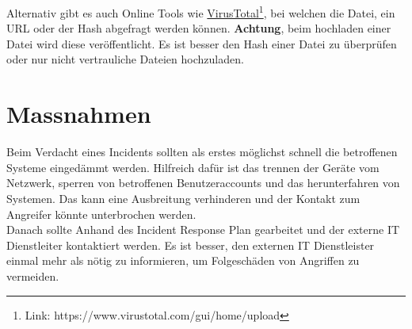 Alternativ gibt es auch Online Tools wie \href{https://www.virustotal.com/gui/home/upload}{VirusTotal}\footnote{Link: https://www.virustotal.com/gui/home/upload}, bei welchen die Datei, ein URL oder der Hash abgefragt werden können.
\textbf{Achtung}, beim hochladen einer Datei wird diese veröffentlicht. 
Es ist besser den Hash einer Datei zu überprüfen oder nur nicht vertrauliche Dateien hochzuladen.

\section{Massnahmen}
Beim Verdacht eines Incidents sollten als erstes möglichst schnell die betroffenen Systeme eingedämmt werden. 
Hilfreich dafür ist das trennen der Geräte vom Netzwerk, sperren von betroffenen Benutzeraccounts und das herunterfahren von Systemen.
Das kann eine Ausbreitung verhinderen und der Kontakt zum Angreifer könnte unterbrochen werden.\\

Danach sollte Anhand des Incident Response Plan gearbeitet und der externe IT Dienstleiter kontaktiert werden.
Es ist besser, den externen IT Dienstleister einmal mehr als nötig zu informieren, um Folgeschäden von Angriffen zu vermeiden. 


